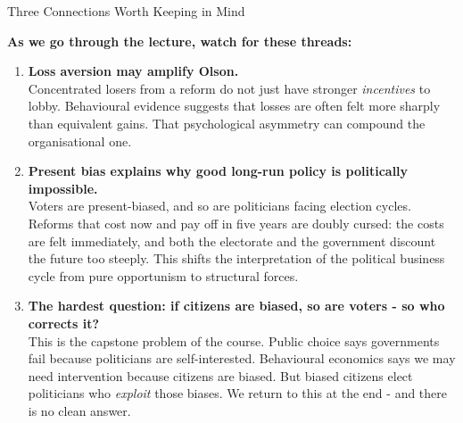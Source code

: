 \documentclass[10pt]{beamer}
\begin{document}
\begin{frame}{Three Connections Worth Keeping in Mind}

\textbf{As we go through the lecture, watch for these threads:}


\begin{enumerate}
\item \textbf{Loss aversion may amplify Olson.} \\[3pt]
\footnotesize Concentrated losers from a reform do not just have stronger \emph{incentives} to lobby. Behavioural evidence suggests that losses are often felt more sharply than equivalent gains. That psychological asymmetry can compound the organisational one.


\item \textbf{Present bias explains why good long-run policy is politically impossible.} \\[3pt]
\footnotesize Voters are present-biased, and so are politicians facing election cycles.
Reforms that cost now and pay off in five years are doubly cursed: the costs are felt immediately, and both the electorate and the government discount the future too steeply. This shifts the interpretation of the political business cycle from pure opportunism to structural forces.


\item \textbf{The hardest question: if citizens are biased, so are voters - so who corrects it?} \\[3pt]
\footnotesize This is the capstone problem of the course.
Public choice says governments fail because politicians are self-interested.
Behavioural economics says we may need intervention because citizens are biased.
But biased citizens elect politicians who \emph{exploit} those biases.
We return to this at the end - and there is no clean answer.
\end{enumerate}
\end{frame}
\end{document}
